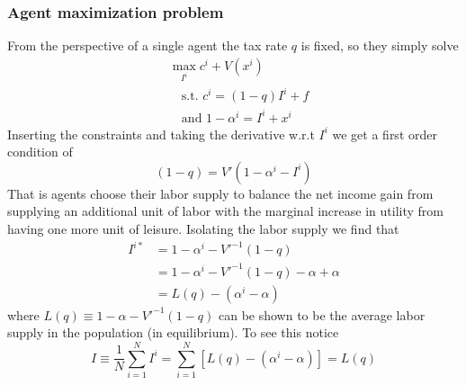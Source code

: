 \subsubsection{Agent maximization problem}
From the perspective of a single agent the tax rate $q$ is fixed, so they simply solve 
\begin{equation}
  \begin{split}
    & \max_{I^i} c^i + V(x^i) \\
    & \quad \text{s.t. } c^i = (1-q)I^i + f \\ 
    & \quad \text{and } 1-\alpha^i = I^i + x^i
  \end{split}
\end{equation}
Inserting the constraints and taking the derivative w.r.t $I^i$ we get a first order condition of  
\begin{equation}
  (1-q) = V'(1-\alpha^i - I^i)
\end{equation}
That is agents choose their labor supply to balance the net income gain from supplying an additional unit of labor with the marginal increase in utility from having one more unit of leisure. Isolating the labor supply we find that 
\begin{equation}
  \begin{split}
  I^{i*} &= 1- \alpha^i -V'^{-1}(1-q) \\ 
  &= 1- \alpha^i -V'^{-1}(1-q) - \alpha + \alpha \\ 
  &= L(q) - (\alpha^i - \alpha)
  \end{split}
\end{equation}
where $L(q) \equiv 1- \alpha - V'^{-1}(1-q)$ can be shown to be the average labor supply in the population (in equilibrium). To see this notice 
\begin{equation}
  I \equiv \frac{1}{N} \sum_{i=1}^N I^i = \sum_{i=1}^N \left[ L(q) - (\alpha^i - \alpha) \right] = L(q)
\end{equation}

